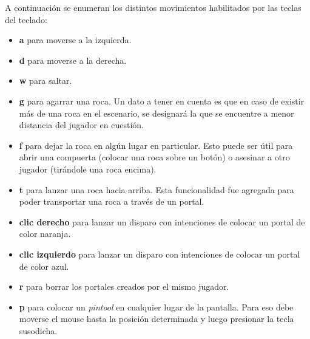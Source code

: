 \documentclass[a4paper]{article}
\begin{document}
A continuación se enumeran los distintos movimientos habilitados por las teclas del teclado:
\begin{itemize}
	\item \textbf{a} para moverse a la izquierda.
	\item \textbf{d} para moverse a la derecha.
	\item \textbf{w} para saltar.
	\item \textbf{g} para agarrar una roca. Un dato a tener en cuenta es que en caso de existir más de una roca en el escenario, se designará la que se encuentre a menor distancia del jugador en cuestión.
	\item \textbf{f} para dejar la roca en algún lugar en particular. Esto puede ser útil para abrir una compuerta (colocar una roca sobre un botón) o asesinar a otro jugador (tirándole una roca encima).
	\item \textbf{t} para lanzar una roca hacia arriba. Esta funcionalidad fue agregada para poder transportar una roca a través de un portal.
	\item \textbf{clic derecho} para lanzar un disparo con intenciones de colocar un portal de color naranja. 
	\item \textbf{clic izquierdo} para lanzar un disparo con intenciones de colocar un portal de color azul. 
	\item \textbf{r} para borrar los portales creados por el mismo jugador.
	\item \textbf{p} para colocar un \textit{pintool} en cualquier lugar de la pantalla. Para eso debe moverse el mouse hasta la posición determinada y luego presionar la tecla susodicha.
\end{itemize}
\end{document}

